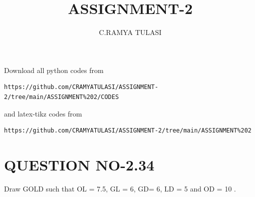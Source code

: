 \documentclass[journal,12pt,twocolumn]{IEEEtran}
\begin{document}
     \def\rightbox#1{\makebox[0in][r]{#1}}
     \def\centbox#1{\makebox[0in]{#1}}
     \def\topbox#1{\raisebox{-\baselineskip}[0in][0in]{#1}}
     \def\midbox#1{\raisebox{-0.5\baselineskip}[0in][0in]{#1}}
\vspace{3cm}
\title{ASSIGNMENT-2}
\author{C.RAMYA TULASI}
\maketitle
\newpage
\bigskip
\renewcommand{\thefigure}{\theenumi}
\renewcommand{\thetable}{\theenumi}
Download all python codes from 
\begin{lstlisting}
https://github.com/CRAMYATULASI/ASSIGNMENT-2/tree/main/ASSIGNMENT%202/CODES
\end{lstlisting}
%
and latex-tikz codes from 
%
\begin{lstlisting}
https://github.com/CRAMYATULASI/ASSIGNMENT-2/tree/main/ASSIGNMENT%202
\end{lstlisting}
%
\section{QUESTION NO-2.34}
\item Draw GOLD such that OL = 7.5, GL = 6, GD= 6, LD = 5 and OD = 10 .
%
\end{document}
